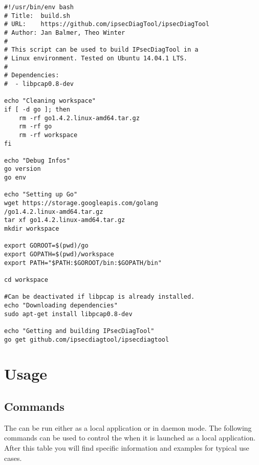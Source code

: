 \lstset{language=bash, breaklines=true}
\begin{lstlisting}
#!/usr/bin/env bash
# Title:  build.sh                                       
# URL:    https://github.com/ipsecDiagTool/ipsecDiagTool
# Author: Jan Balmer, Theo Winter
#    
# This script can be used to build IPsecDiagTool in a
# Linux environment. Tested on Ubuntu 14.04.1 LTS.
#
# Dependencies:
#  - libpcap0.8-dev

echo "Cleaning workspace"
if [ -d go ]; then
	rm -rf go1.4.2.linux-amd64.tar.gz
	rm -rf go
    rm -rf workspace
fi

echo "Debug Infos"
go version
go env

echo "Setting up Go"
wget https://storage.googleapis.com/golang
/go1.4.2.linux-amd64.tar.gz
tar xf go1.4.2.linux-amd64.tar.gz
mkdir workspace

export GOROOT=$(pwd)/go
export GOPATH=$(pwd)/workspace
export PATH="$PATH:$GOROOT/bin:$GOPATH/bin"

cd workspace

#Can be deactivated if libpcap is already installed.
echo "Downloading dependencies"
sudo apt-get install libpcap0.8-dev

echo "Getting and building IPsecDiagTool"
go get github.com/ipsecdiagtool/ipsecdiagtool
\end{lstlisting}


\section{Usage}

\subsection{Commands}
The \entool{} can be run either as a local application or in daemon mode. The following commands can be used to control the \entool{} when it is launched as a local application. After this table you will find specific information and examples for typical use cases.

